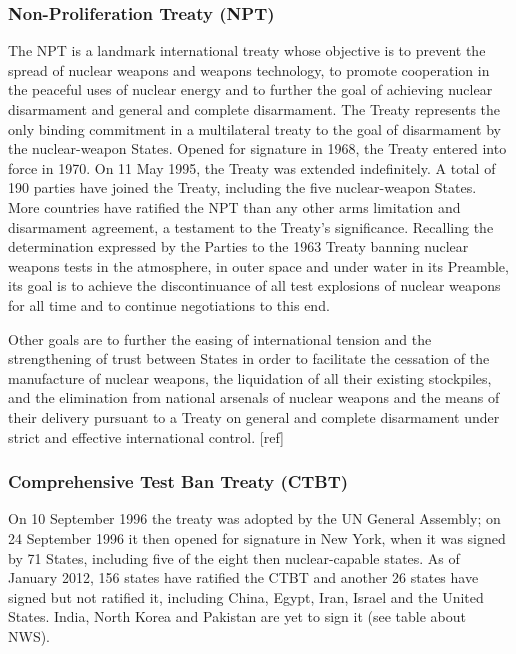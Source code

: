 \documentclass[twocolumn,a4paper]{article}
\begin{document}
\subsubsection{Non-Proliferation Treaty (NPT)}
The NPT is a landmark international treaty whose objective is to prevent the 
spread of nuclear weapons and weapons technology, to promote cooperation in 
the peaceful uses of nuclear energy and to further the goal of achieving 
nuclear disarmament and general and complete disarmament. The Treaty 
represents the only binding commitment in a multilateral treaty to the goal 
of disarmament by the nuclear-weapon States. Opened for signature in 1968, 
the Treaty entered into force in 1970. On 11 May 1995, the Treaty was extended 
indefinitely. A total of 190 parties have joined the Treaty, including the 
five nuclear-weapon States. More countries have ratified the NPT than any 
other arms limitation and disarmament agreement, a testament to the Treaty's 
significance. Recalling the determination expressed by the Parties to the 1963 
Treaty banning nuclear weapons tests in the atmosphere, in outer space and 
under water in its Preamble, its goal is to achieve the discontinuance of 
all test explosions of nuclear weapons for all time and to continue 
negotiations to this end.

Other goals are to further the easing of international tension and the 
strengthening of trust between States in order to facilitate the cessation 
of the manufacture of nuclear weapons, the liquidation of all their existing 
stockpiles, and the elimination from national arsenals of nuclear weapons and 
the means of their delivery pursuant to a Treaty on general and complete 
disarmament under strict and effective international control. [ref]

\subsubsection{Comprehensive Test Ban Treaty (CTBT)}
On 10 September 1996 the treaty was adopted by the UN General Assembly; 
on 24 September 1996 it then opened for signature in New York, when it 
was signed by 71 States, including five of the eight then nuclear-capable 
states. As of January 2012, 156 states have ratified the CTBT and another 
26 states have signed but not ratified it, including China, Egypt, Iran, 
Israel and the United States. India, North Korea and Pakistan are yet to 
sign it (see table about NWS).
\end{document}

